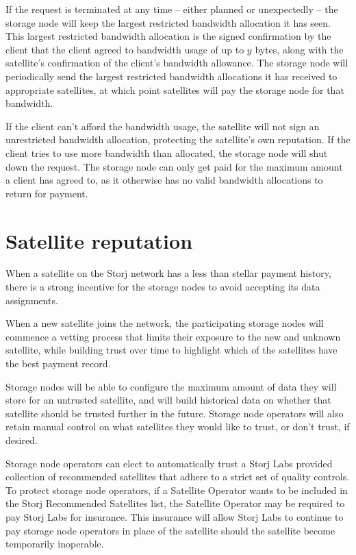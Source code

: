 \documentclass[11pt,fleqn,openany]{book}
\begin{document}
If the request is terminated at any time --
either planned or unexpectedly --
the storage node will keep the largest restricted bandwidth allocation it has
seen.
This largest restricted bandwidth allocation is the signed confirmation
by the client that the client agreed to bandwidth usage of up to $y$
bytes, along with the satellite's confirmation of the client's bandwidth
allowance.
The storage node will periodically send the largest restricted bandwidth
allocations it has received to appropriate satellites, at which point
satellites will pay the storage node for that bandwidth.

If the client can't afford the bandwidth usage, the satellite will not sign an
unrestricted bandwidth allocation, protecting the satellite's own reputation.
If the client tries to use more bandwidth than allocated,
the storage node will shut down the request.
The storage node can only get paid for the maximum amount a client has agreed
to,
as it otherwise has no valid bandwidth allocations to return for
payment.

\section{Satellite reputation}

When a satellite on the Storj network has a less than stellar payment history,
there is a strong incentive for the storage nodes to avoid accepting its data
assignments.

When a new satellite joins the network, the participating storage nodes will
commence a vetting process that limits their exposure to the new and unknown
satellite, while building trust over time to highlight which of the
satellites have the best payment record.

Storage nodes will be able to configure the maximum amount of data they will
store for an untrusted satellite, and will build historical data on whether
that satellite should be trusted further in the future.
Storage node operators will also retain manual control on what satellites they
would like to trust, or don't trust, if desired.

Storage node operators can elect to automatically trust a Storj Labs
provided collection of recommended satellites that adhere to a strict set of
quality controls.
To protect storage node operators, if a Satellite Operator wants to be
included in the Storj Recommended Satellites list, the Satellite Operator may
be required to pay Storj Labs for insurance. This insurance will allow Storj
Labs to continue to pay storage node operators in place of the satellite should
the satellite become temporarily inoperable.
\end{document}
